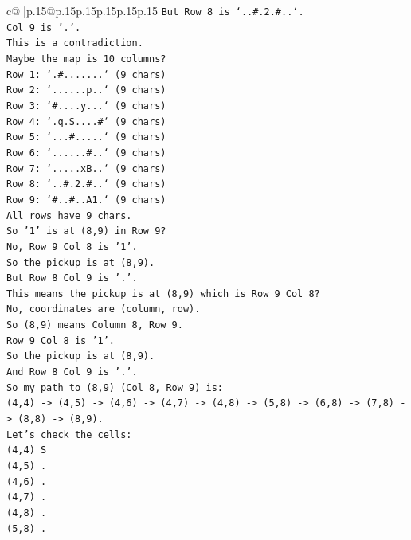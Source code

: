 \documentclass{article}
\begin{document}
{\begin{supertabular}{c@{$\;$}|p{.15\linewidth}@{}p{.15\linewidth}p{.15\linewidth}p{.15\linewidth}p{.15\linewidth}p{.15\linewidth}}
{{{\texttt{But Row 8 is `..\#.2.\#..`.} \\
\texttt{Col 9 is '.'.} \\
\texttt{This is a contradiction.} \\
\texttt{Maybe the map is 10 columns?} \\
\texttt{Row 1: `.\#.......` (9 chars)} \\
\texttt{Row 2: `......p..` (9 chars)} \\
\texttt{Row 3: `\#....y...` (9 chars)} \\
\texttt{Row 4: `.q.S....\#` (9 chars)} \\
\texttt{Row 5: `...\#.....` (9 chars)} \\
\texttt{Row 6: `......\#..` (9 chars)} \\
\texttt{Row 7: `.....xB..` (9 chars)} \\
\texttt{Row 8: `..\#.2.\#..` (9 chars)} \\
\texttt{Row 9: `\#..\#..A1.` (9 chars)} \\
\texttt{All rows have 9 chars.} \\
\texttt{So '1' is at (8,9) in Row 9?} \\
\texttt{No, Row 9 Col 8 is '1'.} \\
\texttt{So the pickup is at (8,9).} \\
\texttt{But Row 8 Col 9 is '.'.} \\
\texttt{This means the pickup is at (8,9) which is Row 9 Col 8?} \\
\texttt{No, coordinates are (column, row).} \\
\texttt{So (8,9) means Column 8, Row 9.} \\
\texttt{Row 9 Col 8 is '1'.} \\
\texttt{So the pickup is at (8,9).} \\
\texttt{And Row 8 Col 9 is '.'.} \\
\texttt{So my path to (8,9) (Col 8, Row 9) is:} \\
\texttt{(4,4) {-}> (4,5) {-}> (4,6) {-}> (4,7) {-}> (4,8) {-}> (5,8) {-}> (6,8) {-}> (7,8) {-}> (8,8) {-}> (8,9).} \\
\texttt{Let's check the cells:} \\
\texttt{(4,4) S} \\
\texttt{(4,5) .} \\
\texttt{(4,6) .} \\
\texttt{(4,7) .} \\
\texttt{(4,8) .} \\
\texttt{(5,8) .} \\
}}}
\end{supertabular}}
\end{document}
